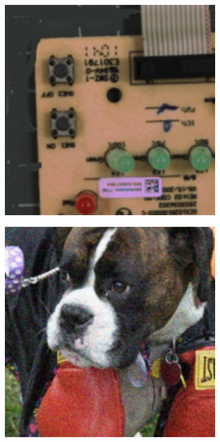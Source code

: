 \begin{figure}
    \centering
    \begin{subfigure}[t]{0.19\textwidth}
        \centering
        \includegraphics[width=1\textwidth]{images/guided/resize_circuit.png}
    \end{subfigure}
    \hfill
    \begin{subfigure}[t]{0.19\textwidth}
        \centering
        \includegraphics[width=1\textwidth]{images/guided/resize_dog.png}

\end{subfigure}
\end{figure}
